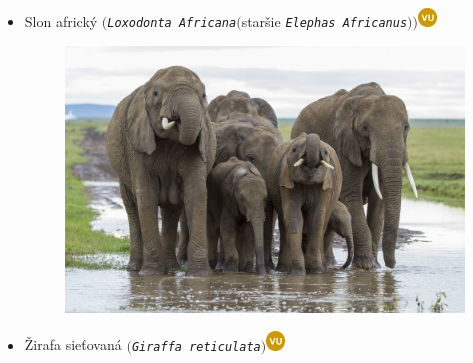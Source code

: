 \documentclass{article}
\begin{document}
\begin{itemize}
\item Slon africký $($\texttt{\textit{Loxodonta Africana$($}}staršie \texttt{\textit{Elephas Africanus$)$}}$)$\includegraphics[width=0.04\textwidth,natwidth=200,natheight=200]{VU.png}\\
\begin{figure}[h]
\includegraphics[scale=0.8]{Slony-masai.jpg}
\end{figure}
\item Žirafa sieťovaná $($\texttt{\textit{Giraffa reticulata}}$)$\includegraphics[width=0.04\textwidth,natwidth=200,natheight=200]{VU.png}


\end{itemize}
\end{document}
